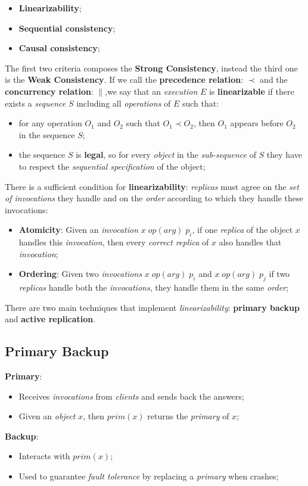 \documentclass{article}
\begin{document}
\begin{itemize}
\item \textbf{Linearizability};
\item \textbf{Sequential consistency};
\item \textbf{Causal consistency};
\end{itemize}
The first two criteria composes the \textbf{Strong Consistency}, instead the third one is the \textbf{Weak Consistency}. 
\clearpage
If we call the \textbf{precedence relation}: $\prec$ and the \textbf{concurrency relation}: $\parallel$,we say that an \emph{execution} $E$ is \textbf{linearizable} if there exists a \emph{sequence} $S$ including all \emph{operations} of $E$ such that:
\begin{itemize}
\item for any operation $O_1$ and $O_2$ such that $O_1 \prec O_2$, then $O_1$ appears before $O_2$ in the sequence $S$;
\item the sequence $S$ is \textbf{legal}, so for every \emph{object} in the \emph{sub-sequence} of $S$ they have to respect the \emph{sequential specification} of the object;
\end{itemize}
There is a sufficient condition for \textbf{linearizability}: \emph{replicas} must agree on the\emph{ set of invocations} they handle and on the \emph{order} according to which they handle these invocations:
\begin{itemize}
\item \textbf{Atomicity}: Given an \emph{invocation} $x\; op(arg)\; p_i$, if one \emph{replica} of the object $x$ handles this \emph{invocation}, then every \emph{correct replica} of $x$ also handles that \emph{invocation};
\item \textbf{Ordering}: Given two \emph{invocations}  $x\; op(arg)\; p_i$ and  $x\; op(arg)\; p_j$ if two \emph{replicas} handle both the \emph{invocations}, they handle them in the same \emph{order};
\end{itemize} 
There are two main techniques that implement \emph{linearizability}: \textbf{primary backup} and \textbf{active replication}.
\subsection{Primary Backup}
\textbf{Primary}:
\begin{itemize}
\item Receives \emph{invocations} from \emph{clients} and sends back the answers;
\item Given an \emph{object} $x$, then $prim(x)$ returns the \emph{primary} of $x$;
\end{itemize}
\textbf{Backup}:
\begin{itemize}
\item Interacts with $prim(x)$;
\item Used to guarantee \emph{fault tolerance} by replacing a \emph{primary} when crashes;
\end{itemize}
\end{document}
